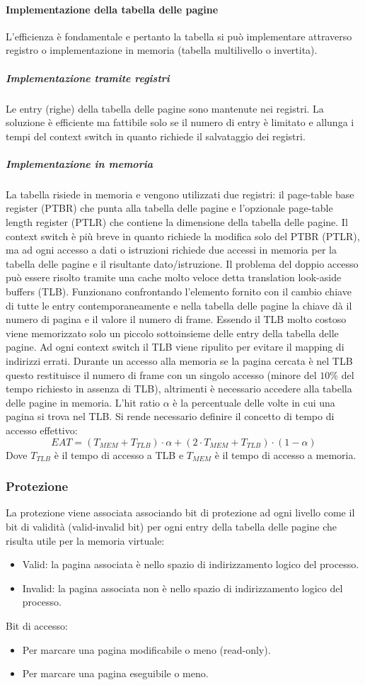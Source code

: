\paragraph{Implementazione della tabella delle pagine}
L'efficienza \`e fondamentale e pertanto la tabella si pu\`o implementare attraverso registro o implementazione in memoria (tabella multilivello o invertita).
\subparagraph{Implementazione tramite registri}
Le entry (righe) della tabella delle pagine sono mantenute nei registri. La soluzione \`e efficiente ma fattibile solo se il numero di entry \`e limitato e allunga i tempi del context
switch in quanto richiede il salvataggio dei registri. 
\subparagraph{Implementazione in memoria}
La tabella risiede in memoria e vengono utilizzati due registri: il page-table base register (PTBR) che punta alla tabella delle pagine e l'opzionale page-table length register (PTLR) 
che contiene la dimensione della tabella delle pagine. Il context switch \`e pi\`u breve in quanto richiede la modifica solo del PTBR (PTLR), ma ad ogni accesso a dati o istruzioni 
richiede due accessi in memoria per la tabella delle pagine e il risultante dato/istruzione. Il problema del doppio accesso pu\`o essere risolto tramite una cache molto veloce
detta translation look-aside buffers (TLB). Funzionano confrontando l'elemento fornito con il cambio chiave di tutte le entry contemporaneamente e nella tabella delle pagine la
chiave d\`a il numero di pagina e il valore il numero di frame. Essendo il TLB molto costoso viene memorizzato solo un piccolo sottoinsieme delle entry della tabella delle pagine. Ad
ogni context switch il TLB viene ripulito per evitare il mapping di indirizzi errati. Durante un accesso alla memoria se la pagina cercata \`e nel TLB questo restituisce il numero di 
frame con un singolo accesso (minore del $10\%$ del tempo richiesto in assenza di TLB), altrimenti \`e necessario accedere alla tabella delle pagine in memoria. L'hit ratio $\alpha$ \`e
la percentuale delle volte in cui una pagina si trova nel TLB. Si rende necessario definire il concetto di tempo di accesso effettivo: 
$$EAT = (T_{MEM} + T_{TLB})\cdot\alpha + (2\cdot T_{MEM} + T_{TLB})\cdot (1-\alpha)$$
Dove $T_{TLB}$ \`e il tempo di accesso a TLB e $T_{MEM}$ \`e il tempo di accesso a memoria.
\subsubsection{Protezione}
La protezione viene associata associando bit di protezione ad ogni livello come il bit di validit\`a (valid-invalid bit) per ogni entry della tabella delle pagine che risulta utile per
la memoria virtuale:
\begin{itemize}
	\item Valid: la pagina associata \`e nello spazio di indirizzamento logico del processo.
	\item Invalid: la pagina associata non \`e nello spazio di indirizzamento logico del processo.
\end{itemize}
Bit di accesso:
\begin{itemize}
	\item Per marcare una pagina modificabile o meno (read-only).
	\item Per marcare una pagina eseguibile o meno. 
\end{itemize}

